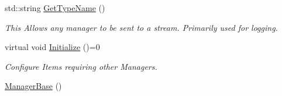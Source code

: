 \begin{DoxyCompactItemize}
std::string \hyperlink{classphys_1_1ManagerBase_a5b4c1105696b868b7858c59541af4756}{GetTypeName} ()
\begin{DoxyCompactList}\small\item\em This Allows any manager to be sent to a stream. Primarily used for logging. \item\end{DoxyCompactList}\item 
virtual void \hyperlink{classphys_1_1ManagerBase_a57dd8e54e767427d5bdcc86dc66d73ed}{Initialize} ()=0
\begin{DoxyCompactList}\small\item\em Configure Items requiring other Managers. \item\end{DoxyCompactList}\item 
\hypertarget{classphys_1_1ManagerBase_a80c0d01d0dc19511cd08fc6ac805a616}{
\hyperlink{classphys_1_1ManagerBase_a80c0d01d0dc19511cd08fc6ac805a616}{ManagerBase} ()}
\label{classphys_1_1ManagerBase_a80c0d01d0dc19511cd08fc6ac805a616}


\end{DoxyCompactItemize}
